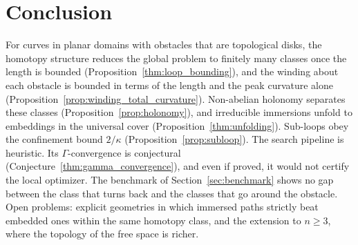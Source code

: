 \documentclass[11pt,reqno]{amsart}
\theoremstyle{definition}
\numberwithin{equation}{section}
\begin{document}
\section{Conclusion}
For curves in planar domains with obstacles that are topological disks, the homotopy structure reduces the global problem to finitely many classes once the length is bounded (Proposition~\ref{thm:loop_bounding}), and the winding about each obstacle is bounded in terms of the length and the peak curvature alone (Proposition~\ref{prop:winding_total_curvature}). Non-abelian holonomy separates these classes (Proposition~\ref{prop:holonomy}), and irreducible immersions unfold to embeddings in the universal cover (Proposition~\ref{thm:unfolding}). Sub-loops obey the confinement bound $2/\kappa$ (Proposition~\ref{prop:subloop}). The search pipeline is heuristic. Its $\Gamma$-convergence is conjectural (Conjecture~\ref{thm:gamma_convergence}), and even if proved, it would not certify the local optimizer. The benchmark of Section~\ref{sec:benchmark} shows no gap between the class that turns back and the classes that go around the obstacle. Open problems: explicit geometries in which immersed paths strictly beat embedded ones within the same homotopy class, and the extension to $n \ge 3$, where the topology of the free space is richer.


\end{document}
